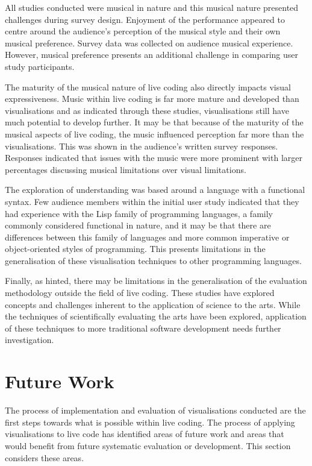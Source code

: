 All studies conducted were musical in nature and this musical nature presented challenges during survey design. Enjoyment of the performance appeared to centre around the audience's perception of the musical style and their own musical preference. Survey data was collected on audience musical experience. However, musical preference presents an additional challenge in comparing user study participants.

The maturity of the musical nature of live coding also directly impacts visual expressiveness. Music within live coding is far more mature and developed than visualisations and as indicated through these studies, visualisations still have much potential to develop further. It may be that because of the maturity of the musical aspects of live coding, the music influenced perception far more than the visualisations. This was shown in the audience's written survey responses. Responses indicated that issues with the music were more prominent with larger percentages discussing musical limitations over visual limitations.

The exploration of understanding was based around a language with a functional syntax. Few audience members within the initial user study indicated that they had experience with the Lisp family of programming languages, a family commonly considered functional in nature, and it may be that there are differences between this family of languages and more common imperative or object-oriented styles of programming. This presents limitations in the generalisation of these visualisation techniques to other programming languages.

Finally, as hinted, there may be limitations in the generalisation of the evaluation methodology outside the field of live coding. These studies have explored concepts and challenges inherent to the application of science to the arts. While the techniques of scientifically evaluating the arts have been explored, application of these techniques to more traditional software development needs further investigation.

\section{Future Work}

The process of implementation and evaluation of visualisations conducted are the first steps towards what is possible within live coding. The process of applying visualisations to live code has identified areas of future work and areas that would benefit from future systematic evaluation or development. This section considers these areas. 

